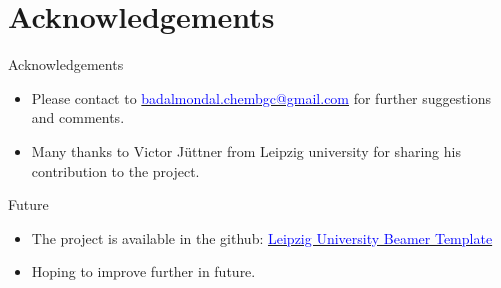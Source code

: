 \section{Acknowledgements}
\begin{frame}{Acknowledgements}
\begin{itemize}
    \item Please contact to \href{mailto:badalmondal.chembgc@gmail.com}{\textcolor{blue}{badalmondal.chembgc@gmail.com}} for further suggestions and comments.
    \item Many thanks to Victor J\"uttner from Leipzig university for sharing his contribution to the project.
\end{itemize}
\end{frame}
\begin{frame}{Future}
    \begin{itemize}
        \item The project is available in the github: \href{https://github.com/bmondal94/Leipzig-Beamer-Template}{\textcolor{blue}{Leipzig University Beamer Template}}
        \item Hoping to improve further in future.
    \end{itemize}
\end{frame}